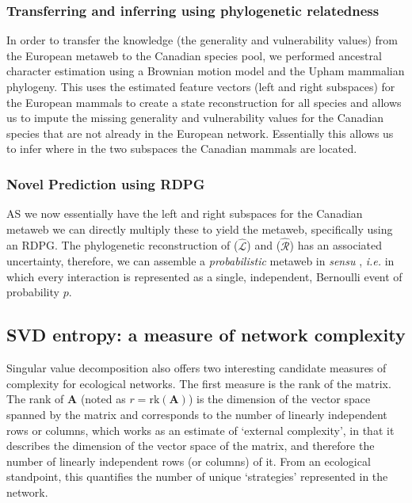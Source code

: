 \subsubsection{Transferring and inferring using phylogenetic relatedness}

In order to transfer the knowledge (the generality and vulnerability
values) from the European metaweb to the
Canadian species pool, we performed ancestral character estimation using
a Brownian motion model and the Upham \cite{Upham2019InfMam} mammalian
phylogeny. This uses the estimated
feature vectors (left and right subspaces) for the European mammals to
create a state reconstruction for all species and allows us to impute
the missing generality and vulnerability values for the Canadian
species that are not already in the European network. Essentially this
allows us to infer where in the two subspaces the Canadian mammals are
located.

\subsubsection{Novel Prediction using RDPG}

AS we now essentially have the left and right subspaces for the Canadian
metaweb we can directly multiply these to yield the metaweb, specifically
using an RDPG. The phylogenetic reconstruction of ($\hat{\mathscr{L}}$) and
($\hat{\mathscr{R}}$) has an associated uncertainty, therefore, we can
assemble a \emph{probabilistic} metaweb in \emph{sensu} \cite{Poisot2016StrPro},
\emph{i.e.} in which every interaction is represented as a single,
independent, Bernoulli event of probability \(p\).

\subsection{SVD entropy: a measure of network
complexity}\label{svd-entropy-a-measure-of-network-complexity}

Singular value decomposition also offers two interesting candidate measures
of complexity for ecological networks. The first measure is the rank of
the matrix. The rank of $\mathbf{A}$ (noted as
$r = \text{rk}(\mathbf{A})$) is the dimension of the vector space
spanned by the matrix and corresponds to the number of linearly
independent rows or columns, which works as an estimate of `external
complexity', in that it describes the dimension of the vector space of
the matrix, and therefore the number of linearly independent rows (or
columns) of it. From an ecological standpoint, this quantifies the
number of unique `strategies' represented in the network.

